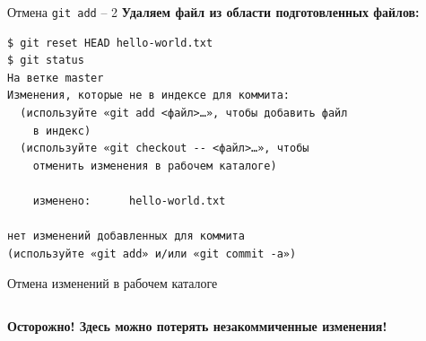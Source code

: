 \documentclass[presentation]{beamer}
\begin{document}
\begin{frame}[fragile]{Отмена \texttt{git add} -- 2}
  \textbf{Удаляем файл из области подготовленных файлов:}
\begin{verbatim}
$ git reset HEAD hello-world.txt
$ git status
На ветке master
Изменения, которые не в индексе для коммита:
  (используйте «git add <файл>…», чтобы добавить файл
    в индекс)
  (используйте «git checkout -- <файл>…», чтобы 
    отменить изменения в рабочем каталоге)

	изменено:      hello-world.txt

нет изменений добавленных для коммита
(используйте «git add» и/или «git commit -a»)
\end{verbatim}
\end{frame}

\begin{frame}[fragile]{Отмена изменений в рабочем каталоге}
  \begin{columns}
    \begin{column}{0.6\textwidth}
  \alert{\textbf{Осторожно!  Здесь можно потерять незакоммиченные
      изменения!}}\newline\newline


\end{column}
\end{columns}
\end{frame}
\end{document}
